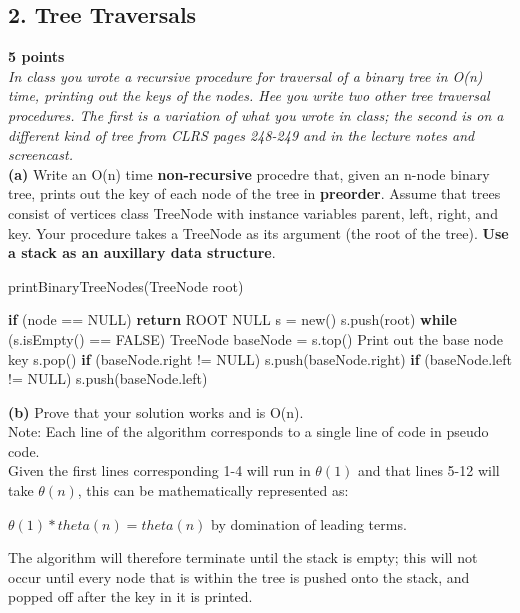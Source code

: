 \documentclass[12pt]{article}
\begin{document}
\subsection*{2. Tree Traversals}
\textbf{5 points} \\
\linebreak
\textit{In class you wrote a recursive procedure for traversal of a binary tree in O(n) time,  printing out the keys of the nodes. Hee you write two other tree traversal procedures. The first is a variation of what you wrote in class; the second is on a different kind of tree from CLRS pages 248-249 and in the lecture notes and screencast.} \\
\linebreak
\textbf{(a)} Write an O(n) time \textbf{non-recursive} procedre that, given an n-node binary tree, prints out the key of each node of the tree in \textbf{preorder}. Assume that trees consist of vertices class TreeNode with instance variables parent, left, right, and key. Your procedure takes a TreeNode as its argument (the root of the tree). \textbf{Use a stack as an auxillary data structure}. \\
\linebreak
\begin{algorithm}[H]
\caption{printBinaryTreeNodes(TreeNode root)}
\begin{algorithmic}[H]
\State \textbf{if} (node == NULL) 
\State \qquad \textbf{return} ROOT NULL
\State s = new()
\State s.push(root)
\State \textbf{while} (s.isEmpty() == FALSE)
\State \qquad TreeNode baseNode = s.top()
\State \qquad Print out the base node key
\State \qquad s.pop()
\State \qquad \textbf{if} (baseNode.right != NULL)
\State \qquad \qquad s.push(baseNode.right)
\State \qquad \textbf{if} (baseNode.left != NULL)
\State \qquad \qquad s.push(baseNode.left)
\end{algorithmic}
\end{algorithm}
\textbf{(b)} Prove that your solution works and is O(n). \\
\linebreak
Note: Each line of the algorithm corresponds to a single line of code in pseudo code. \\
Given the first lines corresponding 1-4 will run in $\theta(1)$ and that lines 5-12 will take $\theta(n)$,  this can be mathematically represented as: \\
\begin{center}
 $\theta(1) * theta(n) = theta(n) $ by domination of leading terms.  
\end{center}
The algorithm will therefore terminate until the stack is empty; this will not occur until every node that is within the tree is pushed onto the stack, and popped off after the key in it is printed. \\
\linebreak
\end{document}

